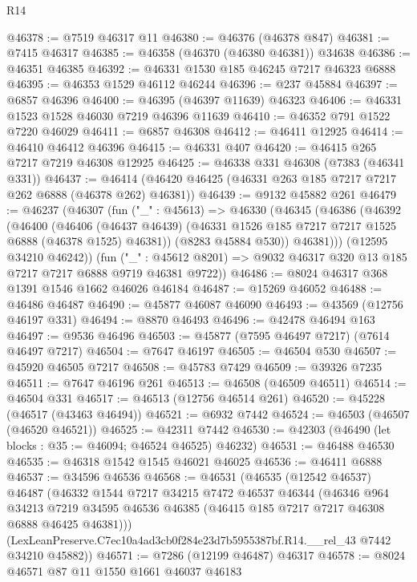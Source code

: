 \begin{lexlean}{R14}
\begin{coremodule}
@46378 := @7519 @46317 @11
@46380 := @46376 (@46378 @847)
@46381 := @7415 @46317
@46385 := @46358 (@46370 (@46380 @46381)) @34638
@46386 := @46351 @46385
@46392 := @46331 @1530 @185 @46245 @7217 @46323 @6888
@46395 := @46353 @1529 @46112 @46244
@46396 := @237 @45884
@46397 := @6857 @46396
@46400 := @46395 (@46397 @11639) @46323
@46406 := @46331 @1523 @1528 @46030 @7219 @46396 @11639
@46410 := @46352 @791 @1522 @7220 @46029
@46411 := @6857 @46308
@46412 := @46411 @12925
@46414 := @46410 @46412 @46396
@46415 := @46331 @407
@46420 := @46415 @265 @7217 @7219 @46308 @12925
@46425 := @46338 @331 @46308 (@7383 (@46341 @331))
@46437 := @46414 (@46420 @46425 (@46331 @263 @185 @7217 @7217 @262 @6888 (@46378 @262) @46381))
@46439 := @9132 @45882 @261
@46479 := @46237
    (@46307
      (fun ("_" : @45613) =>
      @46330
        (@46345
          (@46386
            (@46392
              (@46400
                (@46406
                  (@46437 @46439)
                  (@46331 @1526 @185 @7217 @7217 @1525 @6888 (@46378 @1525) @46381))
                (@8283 @45884 @530))
              @46381)))
        (@12595 @34210 @46242))
      (fun ("_" : @45612 @8201) => @9032 @46317 @320 @13 @185 @7217 @7217 @6888 @9719 @46381 @9722))
@46486 := @8024 @46317 @368 @1391 @1546 @1662 @46026 @46184
@46487 := @15269 @46052
@46488 := @46486 @46487
@46490 := @45877 @46087 @46090
@46493 := @43569 (@12756 @46197 @331)
@46494 := @8870 @46493
@46496 := @42478 @46494 @163
@46497 := @9536 @46496
@46503 := @45877 (@7595 @46497 @7217) (@7614 @46497 @7217)
@46504 := @7647 @46197
@46505 := @46504 @530
@46507 := @45920 @46505 @7217
@46508 := @45783 @7429
@46509 := @39326 @7235
@46511 := @7647 @46196 @261
@46513 := @46508 (@46509 @46511)
@46514 := @46504 @331
@46517 := @46513 (@12756 @46514 @261)
@46520 := @45228 (@46517 (@43463 @46494))
@46521 := @6932 @7442
@46524 := @46503 (@46507 (@46520 @46521))
@46525 := @42311 @7442
@46530 := @42303 (@46490 (let blocks : @35 := @46094; @46524 @46525) @46232)
@46531 := @46488 @46530
@46535 := @46318 @1542 @1545 @46021 @46025
@46536 := @46411 @6888
@46537 := @34596 @46536
@46568 := @46531
    (@46535
      (@12542 @46537)
      @46487
      (@46332
        @1544
        @7217
        @34215
        @7472
        @46537
        @46344
        (@46346
          @964
          @34213
          @7219
          @34595
          @46536
          @46385
          (@46415 @185 @7217 @7217 @46308 @6888 @46425 @46381)))
      (LexLeanPreserve.C7ec10a4ad3cb0f284e23d7b5955387bf.R14.__rel_43 @7442 @34210 @45882))
@46571 := @7286 (@12199 @46487) @46317
@46578 := @8024 @46571 @87 @11 @1550 @1661 @46037 @46183

\end{coremodule}
\end{lexlean}
